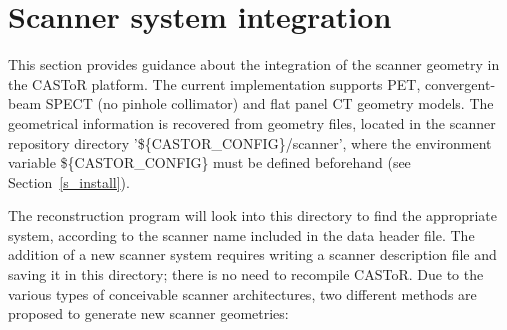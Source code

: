 \documentclass[a4paper, 11pt]{article}
\begin{document}
\newpage
\section{Scanner system integration}
\label{s_scanner_integration}

This section provides guidance about the integration of the scanner geometry in the CASToR platform. 
The current implementation supports PET, convergent-beam SPECT (no pinhole collimator) and flat panel CT geometry models.
The geometrical information is recovered from geometry files, located in the scanner repository directory '\$\{CASTOR\_CONFIG\}/scanner', 
where the environment variable \$\{CASTOR\_CONFIG\} must be defined beforehand (see Section~\ref{s_install}).

The reconstruction program will look into this directory to find the appropriate system, according to the scanner name included in the data header file. 
The addition of a new scanner system requires writing a scanner description file and saving it in this directory; there is no need to recompile CASToR.
Due to the various types of conceivable scanner architectures, two different methods are proposed to generate new scanner geometries:
\end{document}
